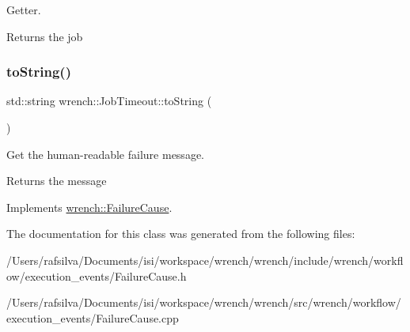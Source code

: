 Getter. 

\begin{DoxyReturn}{Returns}
the job 
\end{DoxyReturn}
\mbox{\label{classwrench_1_1_job_timeout_a91515ca59f71777de74a4b0b169d12e7}} 
\subsubsection{\texorpdfstring{to\+String()}{toString()}}
{\footnotesize\ttfamily std\+::string wrench\+::\+Job\+Timeout\+::to\+String (\begin{DoxyParamCaption}{ }\end{DoxyParamCaption})\hspace{0.3cm}{\ttfamily [virtual]}}



Get the human-\/readable failure message. 

\begin{DoxyReturn}{Returns}
the message 
\end{DoxyReturn}


Implements \hyperlink{classwrench_1_1_failure_cause_afbad248ebe902409f2cd4f1d6f2b867d}{wrench\+::\+Failure\+Cause}.



The documentation for this class was generated from the following files\+:\begin{DoxyCompactItemize}
\item 
/\+Users/rafsilva/\+Documents/isi/workspace/wrench/wrench/include/wrench/workflow/execution\+\_\+events/Failure\+Cause.\+h\item 
/\+Users/rafsilva/\+Documents/isi/workspace/wrench/wrench/src/wrench/workflow/execution\+\_\+events/Failure\+Cause.\+cpp\end{DoxyCompactItemize}

